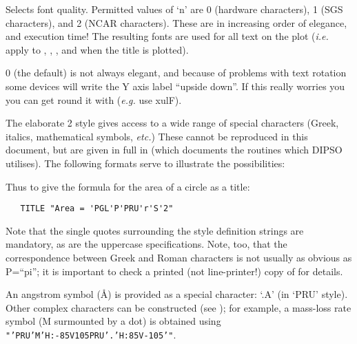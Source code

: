 \begin {description}
Selects font quality. Permitted values of `n' are 0 (hardware
characters), 1 (SGS characters), and 2 (NCAR characters). These are in
increasing order of elegance, and execution time! The resulting fonts
are used for all text on the plot ({\em i.e.} apply to ,  , 
,  and   when the title is plotted).

  0 (the default) is not always elegant, and because of problems
with text rotation some devices will write the Y axis label ``upside
down''. If this really worries you you can get round it with  
({\em e.g.} use   xulF).

The elaborate   2 style gives access to a wide range of special
characters (Greek, italics, mathematical symbols, {\em etc.}) These
cannot be reproduced in this document, but are given in full in
(which documents the routines which DIPSO utilises). The following
formats serve to illustrate the possibilities:

\begin{dipdesc}
\end{dipdesc}

Thus to give the formula for the area of a circle as a title:

\begin{verbatim}
   TITLE "Area = 'PGL'P'PRU'r'S'2"
\end{verbatim}

Note that the single quotes surrounding the style definition strings
are mandatory, as are the uppercase specifications. Note, too, that
the correspondence between Greek and Roman characters is not usually
as obvious as P=``pi''; it is important to check a printed (not
line-printer!) copy of  for details.

An angstrom symbol ({\AA}) is provided as a special character: `.A'
(in `PRU' style). Other complex characters can be constructed (see
); for example, a mass-loss rate symbol (M surmounted by a dot)
is obtained using {\tt{"'PRU'M'H:-85V105PRU'.'H:85V-105'"}}. 


\end{description}
